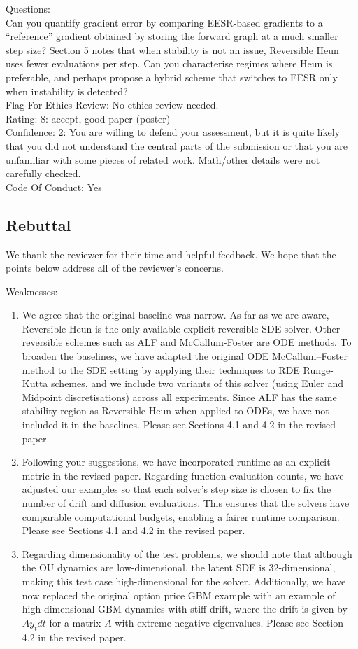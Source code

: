\documentclass{article}
\begin{document}
Questions:\\
Can you quantify gradient error by comparing EESR‑based gradients to a “reference” gradient obtained by storing the forward graph at a much smaller step size?
Section 5 notes that when stability is not an issue, Reversible Heun uses fewer evaluations per step. Can you characterise regimes where Heun is preferable, and perhaps propose a hybrid scheme that switches to EESR only when instability is detected?\\
Flag For Ethics Review: No ethics review needed.\\
Rating: 8: accept, good paper (poster)\\
Confidence: 2: You are willing to defend your assessment, but it is quite likely that you did not understand the central parts of the submission or that you are unfamiliar with some pieces of related work. Math/other details were not carefully checked.\\
Code Of Conduct: Yes

\subsection{Rebuttal}

We thank the reviewer for their time and helpful feedback. We hope that the points below address all of the reviewer's concerns.

Weaknesses:
\begin{enumerate}
    \item We agree that the original baseline was narrow. As far as we are aware, Reversible Heun is the only available explicit reversible SDE solver. Other reversible schemes such as ALF and McCallum-Foster are ODE methods. To broaden the baselines, we have adapted the original ODE McCallum–Foster method to the SDE setting by applying their techniques to RDE Runge-Kutta schemes, and we include two variants of this solver (using Euler and Midpoint discretisations) across all experiments. Since ALF has the same stability region as Reversible Heun when applied to ODEs, we have not included it in the baselines. Please see Sections 4.1 and 4.2 in the revised paper.
    \item Following your suggestions, we have incorporated runtime as an explicit metric in the revised paper. Regarding function evaluation counts, we have adjusted our examples so that each solver’s step size is chosen to fix the number of drift and diffusion evaluations. This ensures that the solvers have comparable computational budgets, enabling a fairer runtime comparison. Please see Sections 4.1 and 4.2 in the revised paper.
    \item Regarding dimensionality of the test problems, we should note that although the OU dynamics are low-dimensional, the latent SDE is 32-dimensional, making this test case high-dimensional for the solver. Additionally, we have now replaced the original option price GBM example with an example of high-dimensional GBM dynamics with stiff drift, where the drift is given by $A y_t dt$ for a matrix $A$ with extreme negative eigenvalues. Please see Section 4.2 in the revised paper.
\end{enumerate}
\end{document}
